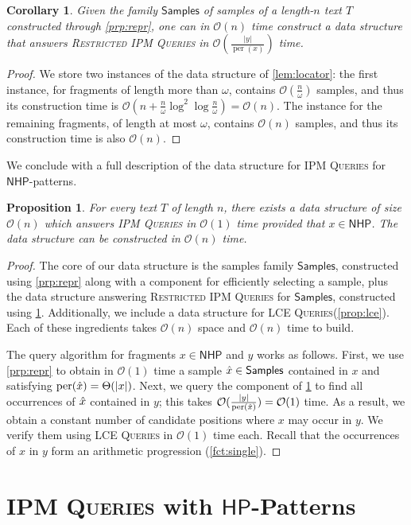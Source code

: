 \documentclass[a4paper]{article}
\newtheorem{corollary}[theorem]{Corollary}
\newtheorem{proposition}[theorem]{Proposition}
\theoremstyle{definition}
\theoremstyle{remark}
\newcommand{\IPM}{\textsc{IPM Queries}\xspace}
\newcommand{\RIPM}{\textsc{Restricted IPM Queries}\xspace}
\newcommand{\LCEQ}{\textsc{LCE Queries}\xspace}
\newcommand{\R}{\mathsf{Samples}}
\newcommand{\N}{\mathsf{NHP}}
\newcommand{\HP}{\mathsf{HP}}
\DeclareMathOperator{\per}{per}
\newcommand{\maybeqed}{}
\newcommand{\Oh}{\mathcal{O}}
\begin{document}
\begin{corollary}\label{cor:locator}
  Given the family $\R$ of samples of a length-$n$ text $T$
  constructed through \cref{prp:repr},
  one can in $\Oh(n)$ time construct a data structure that answers \RIPM
  in $\Oh(\frac{|y|}{\per(x)})$ time.
\end{corollary}
\begin{proof}
We store two instances of the data structure of \cref{lem:locator}: the first instance,
for fragments of length more than $\omega$, contains $\Oh(\frac{n}{\omega})$ samples,
and thus its construction time is $\Oh(n+\frac{n}{\omega}\log^2 \log \frac{n}{\omega})=\Oh(n)$.
The instance for the remaining fragments, of length at most $\omega$, contains $\Oh(n)$
samples, and thus its construction time is also $\Oh(n)$.
\end{proof}

We conclude with a full description of the data structure for \IPM for $\N$-patterns.
\begin{proposition}\label{prp:ipm}
  For every text $T$ of length $n$, there exists a data structure of size $\Oh(n)$ which answers \IPM in $\Oh(1)$ time provided that $x\in \N$. The data structure can be constructed in $\Oh(n)$ time.
\end{proposition}
\begin{proof}
  The core of our data structure is the samples family $\R$, constructed
  using \cref{prp:repr} along with a component for efficiently selecting a sample,
  plus the data structure answering \RIPM for $\R$, constructed using \cref{cor:locator}.
  Additionally, we include a data structure for \LCEQ (\cref{prop:lce}).
  Each of these ingredients takes $\Oh(n)$ space and $\Oh(n)$ time to build. 
  
  The query algorithm for fragments $x\in \N$ and $y$ works as follows.
  First, we use \cref{prp:repr} to obtain in $\Oh(1)$ time a sample $\rx\in \R$ contained in $x$ and satisfying $\per(\rx)=\Theta(|x|)$.
   Next, we query the component of \cref{cor:locator} to find all occurrences of $\hat{x}$ contained in $y$;
   this takes $\Oh(\frac{|y|}{\per(\rx)})=\Oh(1)$ time.
  As a result, we obtain a constant number of candidate positions where $x$ may occur in $y$.
  We verify them using \LCEQ in $\Oh(1)$ time each.
  Recall that the occurrences of $x$ in $y$ form an arithmetic progression (\cref{fct:single}).
  \maybeqed \end{proof}

\section{\IPM with $\HP$-Patterns}\label{chp:per}
\end{document}

